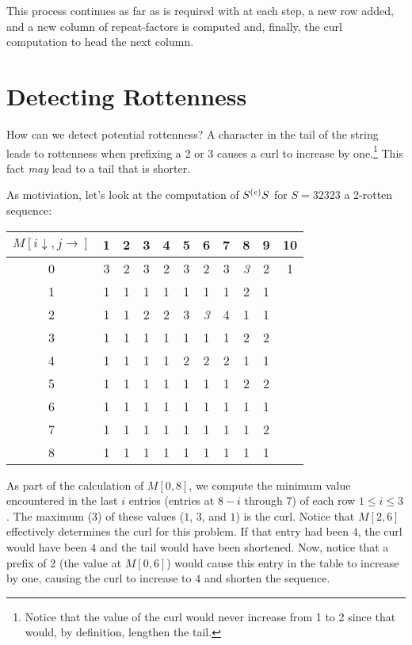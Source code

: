 \documentclass[11pt]{article}
\def\emph#1{{\em #1\/}}
\def\ni{\noindent}
\begin{document}
This process continues as far as is required with at each step, a new row added,
and a new column of repeat-factors is computed and, finally, the curl computation to head the next column.

\section{Detecting Rottenness}
How can we detect potential rottenness?  A character in the tail of the
string leads to rottenness when prefixing a 2 or 3 causes a curl to increase
by one.\footnote{Notice that the value of the curl would never increase from
1 to 2 since that would, by definition, lengthen the tail.}  This fact
\emph{may} lead to a tail that is shorter.

As motiviation, let's look at the computation of $S^{(e)}{S}$ for $S=32323$ a
2-rotten sequence:
\begin{center}
\begin{tabular}{|c||c|c|c|c|c||c|c|c|c|c|}
\hline
$M[i\downarrow,j\rightarrow]$ & 1 & 2 & 3 & 4 & 5 & 6 & 7 & 8 & 9 & 10 \\\hline\hline
0 &  3 & 2 & 3 & 2 & 3 & 2 & 3 & {\em 3} & 2 & 1 \\\hline
1 &  1 & 1 & 1 & 1 & 1 & 1 & 1 & 2 & 1 & \\ 
2 &  1 & 1 & 2 & 2 & 3 & {\em 3} & 4 & 1 & 1 & \\ 
3 &  1 & 1 & 1 & 1 & 1 & 1 & 1 & 2 & 2 & \\ 
4 &  1 & 1 & 1 & 1 & 2 & 2 & 2 & 1 & 1 & \\ 
5 &  1 & 1 & 1 & 1 & 1 & 1 & 1 & 2 & 2 & \\ 
6 &  1 & 1 & 1 & 1 & 1 & 1 & 1 & 1 & 1 & \\ 
7 &  1 & 1 & 1 & 1 & 1 & 1 & 1 & 1 & 2 & \\ 
8 &  1 & 1 & 1 & 1 & 1 & 1 & 1 & 1 & 1 & \\ \hline
\end{tabular}
\end{center}
\ni As part of the calculation of $M[0,8]$, we compute the minimum value
encountered in the last $i$ entries (entries at $8-i$ through $7$) of 
each row $1\le i\le 3$.  The maximum ($3$) of these values ($1$, $3$, and $1$)
is the curl.  Notice that $M[2,6]$ effectively determines the curl for this
problem.  If that entry had been $4$, the curl would have been $4$ and the
tail would have been shortened.  Now, notice that a prefix of 2 (the value
at $M[0,6]$) would cause this entry in the table to increase by one, causing
the curl to increase to $4$ and shorten the sequence.
\end{document}
